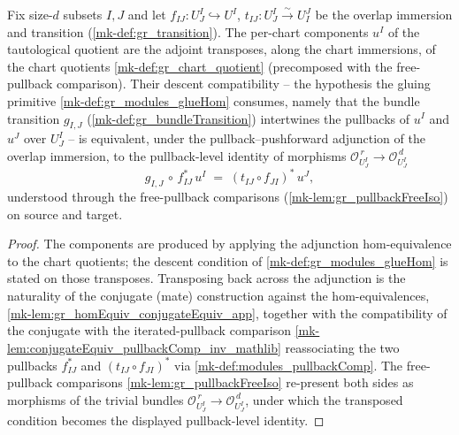 \begin{lemma}\label{mk-lem:gr_tautologicalQuotientComponent_transpose}
  \leanok

  Fix size-\(d\) subsets \(I, J\) and let \(f_{IJ} : U^I_J \hookrightarrow U^I\),
  \(t_{IJ} : U^I_J \xrightarrow{\sim} U^J_I\) be the overlap immersion and transition
  (\ref{mk-def:gr_transition}). The per-chart components \(u^I\) of the tautological quotient
  are the adjoint transposes, along the chart immersions, of the chart quotients
  \ref{mk-def:gr_chart_quotient} (precomposed with the free-pullback comparison). Their
  descent compatibility -- the hypothesis the gluing primitive \ref{mk-def:gr_modules_glueHom}
  consumes, namely that the bundle transition \(g_{I,J}\) (\ref{mk-def:gr_bundleTransition})
  intertwines the pullbacks of \(u^I\) and \(u^J\) over \(U^I_J\) -- is equivalent, under the
  pullback--pushforward adjunction of the overlap immersion, to the pullback-level identity
  of morphisms \(\mathcal{O}_{U^I_J}^{\,r} \to \mathcal{O}_{U^I_J}^{\,d}\)
  \[
    g_{I,J} \,\circ\, f_{IJ}^{*}\,u^I
      \;=\; (t_{IJ} \circ f_{JI})^{*}\,u^J,
  \]
  understood through the free-pullback comparisons (\ref{mk-lem:gr_pullbackFreeIso}) on
  source and target.
\end{lemma}
\begin{proof}
  The components are produced by applying the adjunction hom-equivalence to the chart
  quotients; the descent condition of \ref{mk-def:gr_modules_glueHom} is stated on those
  transposes. Transposing back across the adjunction is the naturality of the conjugate
  (mate) construction against the hom-equivalences, \ref{mk-lem:gr_homEquiv_conjugateEquiv_app},
  together with the compatibility of the conjugate with the iterated-pullback comparison
  \ref{mk-lem:conjugateEquiv_pullbackComp_inv_mathlib} reassociating the two pullbacks
  \(f_{IJ}^{*}\) and \((t_{IJ}\circ f_{JI})^{*}\) via \ref{mk-def:modules_pullbackComp}. The
  free-pullback comparisons \ref{mk-lem:gr_pullbackFreeIso} re-present both sides as morphisms
  of the trivial bundles \(\mathcal{O}_{U^I_J}^{\,r} \to \mathcal{O}_{U^I_J}^{\,d}\), under
  which the transposed condition becomes the displayed pullback-level identity.
\end{proof}

